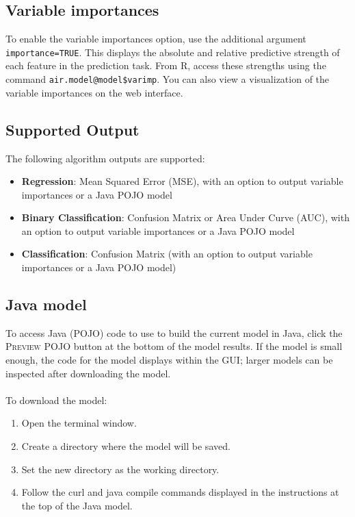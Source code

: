 {\subsection{Variable importances} 

To enable the variable importances option, use the additional argument \texttt{importance=TRUE}. This displays the absolute and relative predictive strength of each feature in the prediction task. From R, access these strengths using the command \texttt{air.model@model\$varimp}. You can also view a visualization of the variable
importances on the web interface.

\subsection{Supported Output}

The following algorithm outputs are supported: 
\begin{itemize}
\item {\bf{Regression}}: Mean Squared Error (MSE), with an option to output variable importances or a Java POJO model
\item {\bf{Binary Classification}}: Confusion Matrix or Area Under Curve (AUC), with an option to output variable importances or a Java POJO model
\item {\bf{Classification}}: Confusion Matrix (with an option to output variable importances or a Java POJO model)
\end{itemize}

\subsection{Java model}  

To access Java (POJO) code to use to build the current model in Java, click the \textsc{Preview POJO} button at the bottom of the model results. If the model is small enough, the code for the model displays within the GUI; larger models can be inspected after downloading the model.
\\
\\
To download the model: 
\begin{enumerate}
\item Open the terminal window.
\item Create a directory where the model will be saved.
\item Set the new directory as the working directory.
\item Follow the curl and java compile commands displayed in the instructions at the top of the Java model.
\end{enumerate}

}
